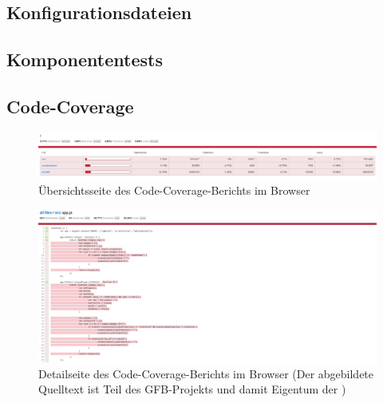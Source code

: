 \subsection{Konfigurationsdateien}
\begin{figure}[H]
	
\end{figure}

\begin{figure}[H]
	
\end{figure}

\subsection{Komponententests}
\begin{figure}[H]
	
\end{figure}


\begin{figure}[H]
	
\end{figure}

\subsection{Code-Coverage}
\begin{figure}[H]
	\includegraphics[width=\textwidth]{abb/code-cov-1.png}
	\caption{Übersichtsseite des Code-Coverage-Berichts im Browser}
	\label{abb:code-cov-1}
\end{figure}

\begin{figure}[H]
	\includegraphics[width=\textwidth]{abb/code-cov-2.png}
	\caption[Detailseite des Code-Coverage-Berichts im Browser]{Detailseite des Code-Coverage-Berichts im Browser (Der abgebildete Quelltext ist Teil des GFB-Projekts und damit Eigentum der \domain)}
	\label{abb:code-cov-2}
\end{figure}
